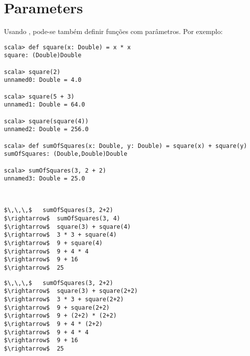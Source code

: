 \section{Parameters}

Usando , pode-se também definir funções com parâmetros. Por exemplo:
\begin{lstlisting}
scala> def square(x: Double) = x * x
square: (Double)Double

scala> square(2)
unnamed0: Double = 4.0

scala> square(5 + 3)
unnamed1: Double = 64.0

scala> square(square(4))
unnamed2: Double = 256.0

scala> def sumOfSquares(x: Double, y: Double) = square(x) + square(y)
sumOfSquares: (Double,Double)Double

scala> sumOfSquares(3, 2 + 2)
unnamed3: Double = 25.0
\end{lstlisting}



\example\ 
 
\begin{lstlisting}
$\,\,\,$   sumOfSquares(3, 2+2)
$\rightarrow$  sumOfSquares(3, 4)
$\rightarrow$  square(3) + square(4)
$\rightarrow$  3 * 3 + square(4)
$\rightarrow$  9 + square(4)
$\rightarrow$  9 + 4 * 4
$\rightarrow$  9 + 16
$\rightarrow$  25
\end{lstlisting}

\begin{lstlisting}
$\,\,\,$   sumOfSquares(3, 2+2)
$\rightarrow$  square(3) + square(2+2)
$\rightarrow$  3 * 3 + square(2+2)
$\rightarrow$  9 + square(2+2)
$\rightarrow$  9 + (2+2) * (2+2)
$\rightarrow$  9 + 4 * (2+2)
$\rightarrow$  9 + 4 * 4
$\rightarrow$  9 + 16
$\rightarrow$  25
\end{lstlisting}

